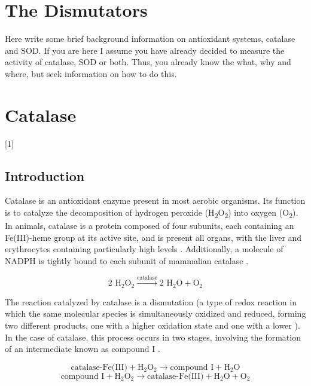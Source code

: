\documentclass[
  9pt,
  american,
  a5paper,
  extrafontsizes,onecolumn,openright
  ]{memoir}
\newcommand{\toc}[1]{%
  \startcontents[chapters]%
  \printcontents[chapters]{}{1}[#1]{}%
  ~\newline%
}
\begin{document}
\chapter{The Dismutators}\label{chapter5}

Here write some brief background information on antioxidant systems, catalase and SOD. If you are here I assume you have already decided to measure the activity of catalase, SOD or both. Thus, you already know the what, why and where, but seek information on how to do this.

\chapter{Catalase}\label{chapter6}

\toc{1}

\newpage

\section{Introduction}\label{cat_intro}

Catalase is an antioxidant enzyme present in most aerobic organisms. Its function is to catalyze the decomposition of hydrogen peroxide (H\textsubscript{2}O\textsubscript{2}) into oxygen (O\textsubscript{2}). In animals, catalase is a protein composed of four subunits, each containing an Fe(III)-heme group at its active site, and is present all organs, with the liver and erythrocytes containing particularly high levels \autocite{halliwell_free_2015}. Additionally, a molecule of NADPH is tightly bound to each subunit of mammalian catalase \autocite{halliwell_free_2015}.

\[
\text{2 H}_2\text{O}_2 \overset{\text{catalase}}{\rightarrow} \text{2 H}_2\text{O} + \text{O}_2
\]

The reaction catalyzed by catalase is a dismutation (a type of redox reaction in which the same molecular species is simultaneously oxidized and reduced, forming two different products, one with a higher oxidation state and one with a lower \autocite{gold_iupac_2019}). In the case of catalase, this process occurs in two stages, involving the formation of an intermediate known as compound I \autocite{halliwell_free_2015}.

\[
\text{catalase-Fe(III)} + \text{H}_2\text{O}_2 \rightarrow \text{compound I} + \text{H}_2\text{O}
\]
\[
\text{compound I} + \text{H}_2\text{O}_2 \rightarrow \text{catalase-Fe(III)} + \text{H}_2\text{O} + \text{O}_2
\]
\end{document}

